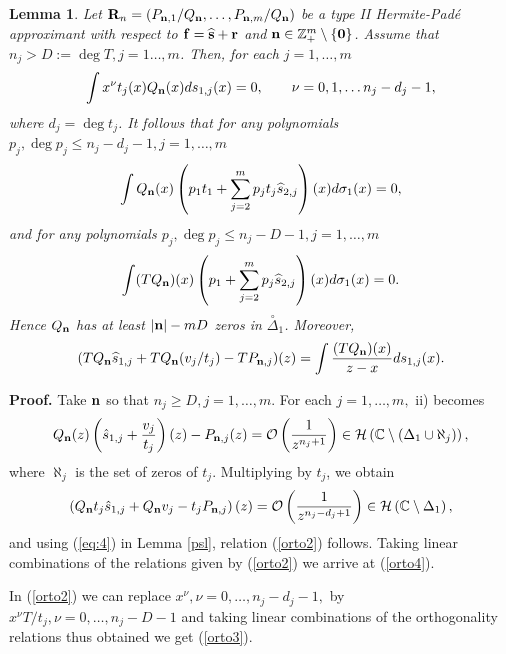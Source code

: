 \documentclass[10pt,a4paper]{article}
\newtheorem{lemma}[theorem]{Lemma}
\theoremstyle{definition}
\theoremstyle{remark}
\numberwithin{equation}{section}
\begin{document}
\begin{lemma} \label{OTII}
Let ${\bf R}_n=\left(P_{{\bf n},1}/Q_{{\bf n}},\ldots, P_{{\bf n},m}/Q_{{\bf n}}\right)$ be a type II Hermite-Pad\'e approximant with respect to ${\bf f} = \widehat{\bf s} + {\bf r}$ and ${\bf n} \in \mathbb{Z}_+^m \setminus \{{\bf 0}\}$. Assume that $n_j > D:= \deg T, j=1\ldots,m$. Then, for each $j=1,\ldots,m$
\begin{equation}\label{orto2}
\int  x^{\nu} t_j(x)Q_{{\bf n}}(x)ds_{1,j}(x)=0,  \qquad \nu=0,1, \ldots n_{j}-d_j-1,
\end{equation}
where $d_j = \deg t_j$. It follows that for any polynomials $p_j, \deg p_j \leq n_j - d_j -1, j=1,\ldots,m$
\begin{equation}\label{orto4}
\int  Q_{{\bf n}}(x) \left( p_1  t_1  + \sum_{j=2}^m p_j  t_j  \widehat{s}_{2,j} \right)(x) d\sigma_1(x)=0,
\end{equation}
and for any polynomials $p_j, \deg p_j \leq n_j - D -1, j=1,\ldots,m$
\begin{equation}\label{orto3}
\int  (TQ_{{\bf n}})(x) \left( p_1     + \sum_{j=2}^m p_j    \widehat{s}_{2,j} \right)(x) d\sigma_1(x)=0.
\end{equation}
Hence $ Q_{{\bf n}} $ has at least  $\left|{\bf n}\right|-mD$  zeros in   $\stackrel{\circ}{\Delta}_{1}$. Moreover,
\begin{equation}\label{restoint}
(T Q_{{\bf n}} \widehat{s}_{1,j} + TQ_{{\bf n}}(v_{j}/t_{j})  -T P_{{\bf n},j})(z)=\int \frac{(TQ_{{\bf n}})(x)}{z-x}ds_{1,j}(x).
\end{equation}
\end{lemma}


{\bf Proof.} Take $\bf n$ so that $n_j \geq D, j=1,\ldots,m$. For each $j=1,\ldots,m,$ ii) becomes
\[
Q_{{\bf n}}(z)\left(\hat{s}_{1,j}+\frac{v_{j}}{t_{j}}\right)(z) -P_{{\bf n},j}(z)=\mathcal{O}\left(\frac{1}{z^{n_{j}+1}}\right)\in {\mathcal{H}}\left({ {\mathbb{C}}}\setminus \left(\Delta_1 \cup \aleph_j\right)\right),
\]
where $\aleph_j$ is the set of zeros of $t_j$. Multiplying by $t_j$, we obtain
\[
\left(Q_{{\bf n}}t_j\hat{s}_{1,j}+Q_{{\bf n}}v_{j} -t_jP_{{\bf n},j}\right)(z)=\mathcal{O}\left(\frac{1}{z^{n_{j}-d_j+1}}\right)\in {\mathcal{H}}\left( {\mathbb{C}}\setminus \Delta_1 \right),
\]
and using  (\ref{eq:4}) in Lemma \ref{psl}, relation (\ref{orto2}) follows.
Taking  linear combinations of the relations given by (\ref{orto2}) we arrive at (\ref{orto4}).

In (\ref{orto2}) we can replace $x^{\nu}, \nu=0,\ldots,n_j -d_j -1,$ by $x^{\nu}T/t_j, \nu=0,\ldots,n_j -D -1$
and taking linear combinations of the orthogonality relations thus obtained  we get (\ref{orto3}).
\end{document}
